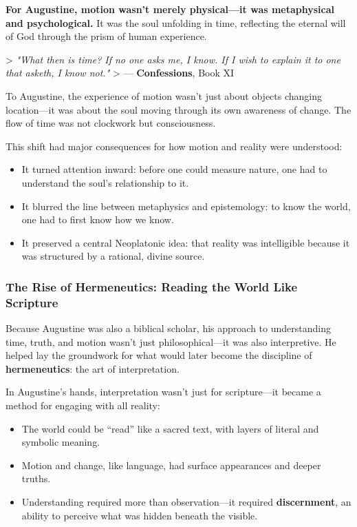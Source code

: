 \textbf{For Augustine, motion wasn’t merely physical—it was metaphysical and psychological.} It was the soul unfolding in time, reflecting the eternal will of God through the prism of human experience.

> \textit{"What then is time? If no one asks me, I know. If I wish to explain it to one that asketh, I know not."}  
> — \textbf{Confessions}, Book XI

To Augustine, the experience of motion wasn’t just about objects changing location—it was about the soul moving through its own awareness of change. The flow of time was not clockwork but consciousness.

\vspace{1em}
\noindent This shift had major consequences for how motion and reality were understood:

\begin{itemize}
    \item It turned attention inward: before one could measure nature, one had to understand the soul’s relationship to it.
    \item It blurred the line between metaphysics and epistemology: to know the world, one had to first know how we know.
    \item It preserved a central Neoplatonic idea: that reality was intelligible because it was structured by a rational, divine source.
\end{itemize}

\subsubsection*{The Rise of Hermeneutics: Reading the World Like Scripture}

Because Augustine was also a biblical scholar, his approach to understanding time, truth, and motion wasn’t just philosophical—it was also interpretive. He helped lay the groundwork for what would later become the discipline of \textbf{hermeneutics}: the art of interpretation.

In Augustine’s hands, interpretation wasn’t just for scripture—it became a method for engaging with all reality:

\begin{itemize}
    \item The world could be “read” like a sacred text, with layers of literal and symbolic meaning.
    \item Motion and change, like language, had surface appearances and deeper truths.
    \item Understanding required more than observation—it required \textbf{discernment}, an ability to perceive what was hidden beneath the visible.
\end{itemize}

